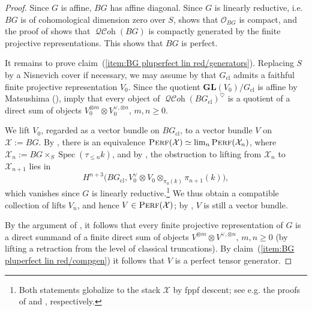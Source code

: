 \documentclass[12pt, oneside]{amsart}
\numberwithin{equation}{section}
\theoremstyle{remark}
\theoremstyle{plain}
\renewcommand{\ge}{\geqslant}
\renewcommand{\le}{\leqslant}
\DeclareMathOperator{\QCOH}{\mathcal{QC}\textit{oh}}
\DeclareMathOperator{\Perf}{\textsc{Perf}}
\newcommand{\OO}{\mathcal{O}}
\newcommand{\XX}{\mathcal{X}}
\DeclareMathOperator{\spc}{Spec}
\newcommand{\GL}{\mathbf{GL}}
\newcommand{\cl}{{\operatorname{cl}}}
\begin{document}
\begin{proof}
  Since $G$ is affine, $BG$ has affine diagonal.
  Since $G$ is linearly reductive, i.e. $BG$ is of cohomological dimension zero over $S$, \cite[Prop.~9.1.5.3]{SAG} shows that $\OO_{BG}$ is compact, and the proof of \cite[Prop.~A.3.4]{BKRS} shows that $\QCOH(BG)$ is compactly generated by the finite projective representations.
  This shows that $BG$ is perfect.

  It remains to prove claim~(\ref{item:BG pluperfect lin red/generators}).
  Replacing $S$ by a Nisnevich cover if necessary, we may assume by \cite[Cor.~6.2(2)]{AHRLocalStructure} that $G_\cl$ admits a faithful finite projective representation $V_0$.
  Since the quotient $\GL(V_0)/G_\cl$ is affine by Matsushima (\cite[Rem.~2.5]{AHRLocalStructure}), \cite[Thm.~5.4, Prop.~5.5]{Gross} imply that every object of $\QCOH(BG_\cl)^\heartsuit$ is a quotient of a direct sum of objects $V_0^{\otimes m} \otimes V_0^{\vee, \otimes n}$, $m,n\ge 0$.

  We lift $V_0$, regarded as a vector bundle on $BG_\cl$, to a vector bundle $V$ on $\XX := BG$.
  By \cite[Cor.~19.2.1.4]{SAG}, there is an equivalence $\Perf(\XX) \simeq \lim_n \Perf(\XX_n)$, where $\XX_n := BG \times_S \spc(\tau_{\le n}k)$, and by \cite[Rem.~19.2.2.6]{SAG}, the obstruction to lifting from $\XX_n$ to $\XX_{n+1}$ lies in
  \[ H^{n+3}\bigl(BG_\cl, V_0^\vee \otimes V_0 \otimes_{\pi_0(k)} \pi_{n+1}(k) \bigr), \]
  which vanishes since $G$ is linearly reductive.\footnote{%
    Both \cite{SAG} statements globalize to the stack $\XX$ by fppf descent; see e.g. the proofs of \cite[Prop.~3.1.5]{HLP} and \cite[Lem.~5.1.11, Prop.~5.1.13]{HLP}, respectively.
  }
  We thus obtain a compatible collection of lifts $V_n$, and hence $V \in \Perf(\XX)$; by \cite[Prop.~2.7.3.2]{SAG}, $V$ is still a vector bundle.

  By the argument of \cite[Lem.~A.2.6(i)]{BKRS}, it follows that every finite projective representation of $G$ is a direct summand of a finite direct sum of objects $V^{\otimes m}\otimes V^{\vee,\otimes n}$, $m,n\ge0$ (by lifting a retraction from the level of classical truncations).
  By claim~(\ref{item:BG pluperfect lin red/compgen}) it follows that $V$ is a perfect tensor generator.
\end{proof}
\end{document}
